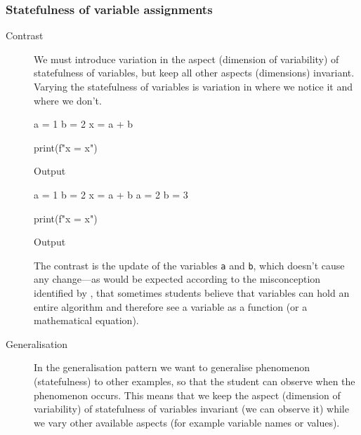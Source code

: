 \subsubsection{Statefulness of variable assignments}

\begin{description}
  \item [Contrast] We must introduce variation in the aspect (dimension of 
    variability) of statefulness of variables, but keep all other aspects 
    (dimensions) invariant.
    Varying the statefulness of variables is variation in where we notice it 
    and where we don't.

    \begin{frame}[fragile]
    \begin{minipage}[t]{0.45\columnwidth}
      \begin{pyblock}[varstateC1]
a = 1
b = 2
x = a + b



print(f"x = {x}")
      \end{pyblock}
      \begin{block}{Output}\printpythontex[verbatim]\end{block}
    \end{minipage}
    \hfill
    \begin{minipage}[t]{0.45\columnwidth}
      \begin{pyblock}[varstateC2][highlightlines={4-5}]
a = 1
b = 2
x = a + b
a = 2
b = 3

print(f"x = {x}")
      \end{pyblock}
      \begin{block}{Output}\printpythontex[verbatim]\end{block}
    \end{minipage}
    \end{frame}

    The contrast is the update of the variables \texttt{a} and 
    \texttt{b}, which doesn't cause any change---as would be 
    expected according to the misconception identified by
    \textcite{Kohn2017VariableEvaluation,Plass2015Variables,Doukakis2007}, that 
    sometimes students believe that variables can hold an entire algorithm and 
    therefore see a variable as a function (or a mathematical equation).

    \item [Generalisation] In the generalisation pattern we want to generalise 
      phenomenon (statefulness) to other examples, so that the student can 
      observe when the phenomenon occurs.
      This means that we keep the aspect (dimension of variability) of 
      statefulness of variables invariant (we can observe it) while we vary 
      other available aspects (for example variable names or values).
    

\end{description}
